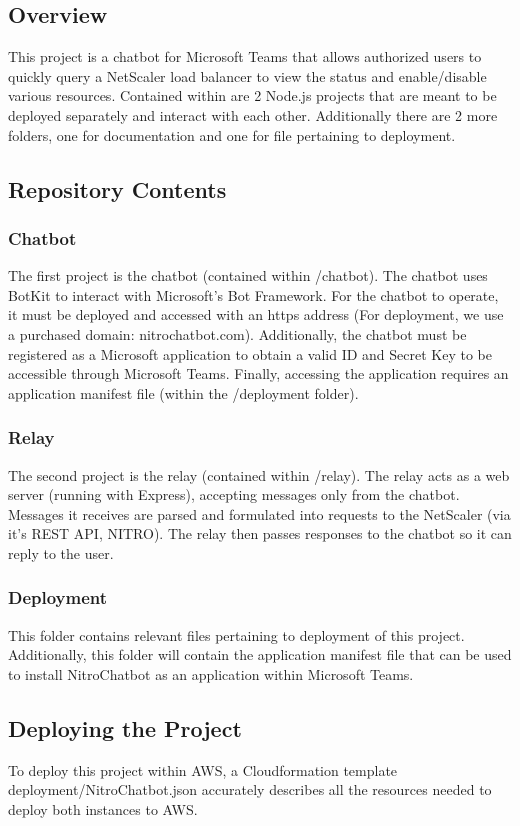 \documentclass[onecolumn, draftclsnofoot,10pt, compsoc]{IEEEtran}
\begin{document}
\subsection{Overview}
This project is a chatbot for Microsoft Teams that allows authorized users to quickly query a NetScaler load balancer to view the status and enable/disable various resources.
Contained within are 2 Node.js projects that are meant to be deployed separately and interact with each other. Additionally there are 2 more folders, one for documentation and one for file pertaining to deployment.

\subsection{Repository Contents}
\subsubsection{Chatbot}
The first project is the chatbot (contained within /chatbot).
The chatbot uses BotKit to interact with Microsoft's Bot Framework.
For the chatbot to operate, it must be deployed and accessed with an https address (For deployment, we use a purchased domain: nitrochatbot.com).
Additionally, the chatbot must be registered as a Microsoft application to obtain a valid ID and Secret Key to be accessible through Microsoft Teams.
Finally, accessing the application requires an application manifest file (within the /deployment folder).

\subsubsection{Relay}
The second project is the relay (contained within /relay).
The relay acts as a web server (running with Express), accepting messages only from the chatbot.
Messages it receives are parsed and formulated into requests to the NetScaler (via it's REST API, NITRO).
The relay then passes responses to the chatbot so it can reply to the user.

\subsubsection{Deployment}
This folder contains relevant files pertaining to deployment of this project.
Additionally, this folder will contain the application manifest file that can be used to install NitroChatbot as an application within Microsoft Teams.

\subsection{Deploying the Project}
To deploy this project within AWS, a Cloudformation template deployment/NitroChatbot.json accurately describes all the resources needed to deploy both instances to AWS.
\end{document}
